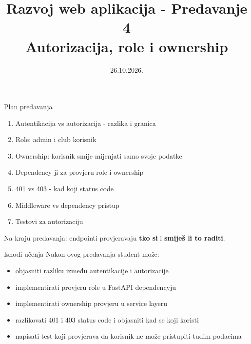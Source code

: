 

\title[Razvoj web aplikacija]{Razvoj web aplikacija - Predavanje 4 \\ Autorizacija, role i ownership}
\date{26.10.2026.}



\frame{\titlepage}

\begin{frame}{Plan predavanja}
\begin{enumerate}
  \item Autentikacija vs autorizacija - razlika i granica
  \item Role: admin i club korisnik
  \item Ownership: korisnik smije mijenjati samo svoje podatke
  \item Dependency-ji za provjeru role i ownership
  \item 401 vs 403 - kad koji status code
  \item Middleware vs dependency pristup
  \item Testovi za autorizaciju
\end{enumerate}

\vspace{0.6em}
Na kraju predavanja: endpointi provjeravaju \textbf{tko si} i \textbf{smiješ li to raditi}.
\end{frame}

\begin{frame}{Ishodi učenja}
Nakon ovog predavanja student može:
\begin{itemize}
  \item objasniti razliku između autentikacije i autorizacije
  \item implementirati provjeru role u FastAPI dependencyju
  \item implementirati ownership provjeru u service layeru
  \item razlikovati 401 i 403 status code i objasniti kad se koji koristi
  \item napisati test koji provjerava da korisnik ne može pristupiti tuđim podacima
\end{itemize}
\end{frame}

